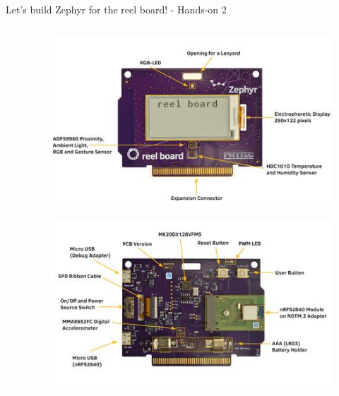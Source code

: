 \documentclass[10pt, aspectratio=169]{beamer}
\begin{document}
\begin{frame}[fragile]{Let's build Zephyr for the reel board! - Hands-on 2}
\begin{columns}
\begin{column}{0.6\textwidth}
    \end{column}
    \begin{column}{0.4\textwidth}
      \begin{figure}
        \includegraphics[width=.9\textwidth]{images/reel_board.jpg}
      \end{figure}
      \begin{figure}
        \includegraphics[width=.9\textwidth]{images/reel_board_descr_back.jpg}
      \end{figure}
    \end{column}
  \end{columns}
\end{frame}
\end{document}
